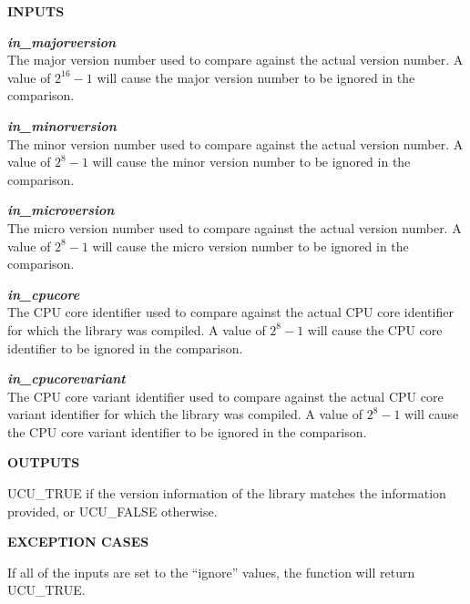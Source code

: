 \noindent\textbf{INPUTS}
\begin{list}{}{\setlength{\leftmargin}{0.5in}\setlength{\itemindent}{-0.25in}\setlength{\topsep}{0.0in}\setlength{\partopsep}{0.0in}}
\item \emph{\textbf{in\_majorversion}}\\
      The major version number used to compare against the actual version
      number.  A value of $2^{16}-1$ will cause the major version number
      to be ignored in the comparison.
\item \emph{\textbf{in\_minorversion}}\\
      The minor version number used to compare against the actual version
      number.  A value of $2^{8}-1$ will cause the minor version number
      to be ignored in the comparison.
\item \emph{\textbf{in\_microversion}}\\
      The micro version number used to compare against the actual version
      number.  A value of $2^{8}-1$ will cause the micro version number
      to be ignored in the comparison.
\item \emph{\textbf{in\_cpucore}}\\
      The CPU core identifier used to compare against the actual CPU core
      identifier for which the library was compiled.
      A value of $2^{8}-1$ will cause the CPU core identifier
      to be ignored in the comparison.
\item \emph{\textbf{in\_cpucorevariant}}\\
      The CPU core variant identifier used to compare against the actual CPU core
      variant identifier for which the library was compiled.
      A value of $2^{8}-1$ will cause the CPU core variant identifier
      to be ignored in the comparison.
\end{list}
\vspace{2.8ex}

\noindent\textbf{OUTPUTS}
\begin{list}{}{\setlength{\leftmargin}{0.25in}\setlength{\topsep}{0.0in}}
\item UCU\_TRUE if the version information of the library matches
      the information provided, or UCU\_FALSE otherwise.
\end{list}
\vspace{2.8ex}

\noindent\textbf{EXCEPTION CASES}
\begin{list}{}{\setlength{\leftmargin}{0.25in}\setlength{\topsep}{0.0in}}
\item If all of the inputs are set to the ``ignore'' values,
      the function will return UCU\_TRUE.
\end{list}
\vspace{2.8ex}

